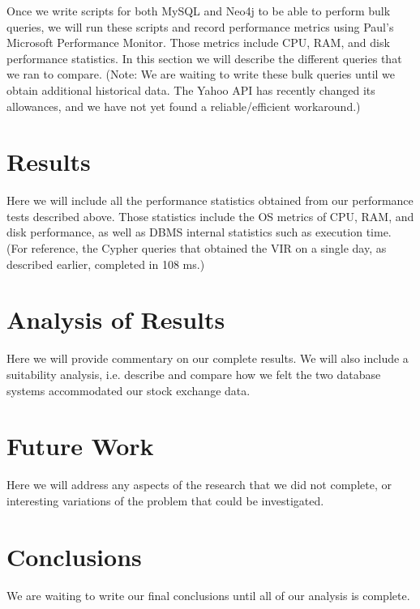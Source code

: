 \documentclass{IEEEtran}
\begin{document}
Once we write scripts for both MySQL and Neo4j to be able to perform bulk queries, we will run these scripts and record performance metrics using Paul’s Microsoft Performance Monitor. Those metrics include CPU, RAM, and disk performance statistics. In this section we will describe the different queries that we ran to compare. (Note: We are waiting to write these bulk queries until we obtain additional historical data. The Yahoo API has recently changed its allowances, and we have not yet found a reliable/efficient workaround.)

\section{Results}

Here we will include all the performance statistics obtained from our performance tests described above. Those statistics include the OS metrics of CPU, RAM, and disk performance, as well as DBMS internal statistics such as execution time. (For reference, the Cypher queries that obtained the VIR on a single day, as described earlier, completed in 108 ms.) 

\section{Analysis of Results}

Here we will provide commentary on our complete results. We will also include a suitability analysis, i.e. describe and compare how we felt the two database systems accommodated our stock exchange data.

\section{Future Work}

Here we will address any aspects of the research that we did not complete, or interesting variations of the problem that could be investigated. 

\section{Conclusions}

We are waiting to write our final conclusions until all of our analysis is complete. 



\end{document}
